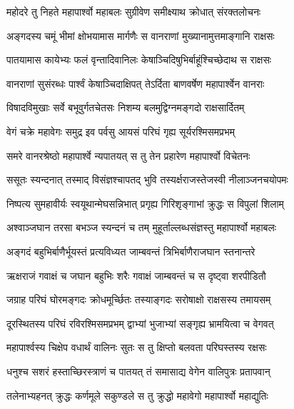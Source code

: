
\twolineshloka
{महोदरे तु निहते महापार्श्वो महाबलः}
{सुग्रीवेण समीक्ष्याथ क्रोधात् संरक्तलोचनः} %

\twolineshloka
{अङ्गदस्य चमूं भीमां क्षोभयामास मार्गणैः}
{स वानराणां मुख्यानामुत्तमाङ्गानि राक्षसः} %

\twolineshloka
{पातयामास कायेभ्यः फलं वृन्तादिवानिलः}
{केषाञ्चिदिषुभिर्बाहूंश्चिच्छेदाथ स राक्षसः} %

\twolineshloka
{वानराणां सुसंरब्धः पार्श्वं केषाञ्चिदाक्षिपत्}
{तेऽर्दिता बाणवर्षेण महापार्श्वेन वानराः} %

\twolineshloka
{विषादविमुखाः सर्वे बभूवुर्गतचेतसः}
{निशम्य बलमुद्विग्नमङ्गदो राक्षसार्दितम्} %

\twolineshloka
{वेगं चक्रे महावेगः समुद्र इव पर्वसु}
{आयसं परिघं गृह्य सूर्यरश्मिसमप्रभम्} %

\twolineshloka
{समरे वानरश्रेष्ठो महापार्श्वे न्यपातयत्}
{स तु तेन प्रहारेण महापार्श्वो विचेतनः} %

\twolineshloka
{ससूतः स्यन्दनात् तस्माद् विसंज्ञश्चापतद् भुवि}
{तस्यर्क्षराजस्तेजस्वी नीलाञ्जनचयोपमः} %

\twolineshloka
{निष्पत्य सुमहावीर्यः स्वयूथान्मेघसन्निभात्}
{प्रगृह्य गिरिशृङ्गाभां क्रुद्धः स विपुलां शिलाम्} %

\twolineshloka
{अश्वाञ्जघान तरसा बभञ्ज स्यन्दनं च तम्}
{मुहूर्ताल्लब्धसंज्ञस्तु महापार्श्वो महाबलः} %

\twolineshloka
{अङ्गदं बहुभिर्बाणैर्भूयस्तं प्रत्यविध्यत}
{जाम्बवन्तं त्रिभिर्बाणैराजघान स्तनान्तरे} %

\twolineshloka
{ऋक्षराजं गवाक्षं च जघान बहुभिः शरैः}
{गवाक्षं जाम्बवन्तं च स दृष्ट्वा शरपीडितौ} %

\twolineshloka
{जग्राह परिघं घोरमङ्गदः क्रोधमूर्च्छितः}
{तस्याङ्गदः सरोषाक्षो राक्षसस्य तमायसम्} %

\twolineshloka
{दूरस्थितस्य परिघं रविरश्मिसमप्रभम्}
{द्वाभ्यां भुजाभ्यां सङ्गृह्य भ्रामयित्वा च वेगवत्} %

\twolineshloka
{महापार्श्वस्य चिक्षेप वधार्थं वालिनः सुतः}
{स तु क्षिप्तो बलवता परिघस्तस्य रक्षसः} %

\twolineshloka
{धनुश्च सशरं हस्ताच्छिरस्त्राणं च पातयत्}
{तं समासाद्य वेगेन वालिपुत्रः प्रतापवान्} %

\twolineshloka
{तलेनाभ्यहनत् क्रुद्धः कर्णमूले सकुण्डले}
{स तु क्रुद्धो महावेगो महापार्श्वो महाद्युतिः} %

